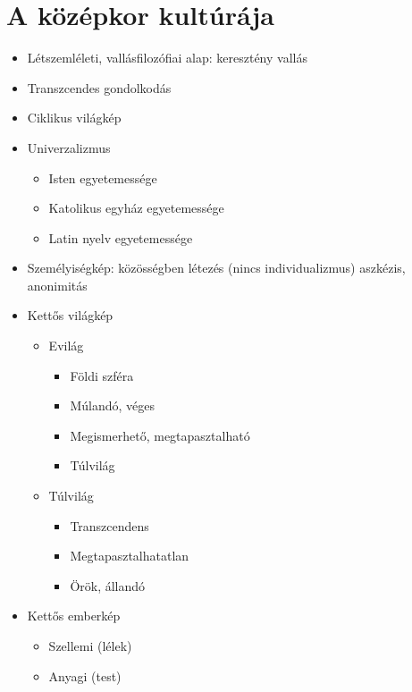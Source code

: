 \documentclass{article}
\begin{document}
\section{A középkor kultúrája}
\begin{itemize}
    \item Létszemléleti, vallásfilozófiai alap: keresztény vallás
    \item Transzcendes gondolkodás
    \item Ciklikus világkép
    
    \item Univerzalizmus 
    \begin{itemize}
        \item Isten egyetemessége
        \item Katolikus egyház egyetemessége
        \item Latin nyelv egyetemessége
    \end{itemize}

    \item Személyiségkép: közösségben létezés (nincs individualizmus) aszkézis, anonimitás

    \item Kettős világkép 
    \begin{itemize}
        \item Evilág 
        \begin{itemize}
            \item Földi szféra
            \item Múlandó,  véges
            \item Megismerhető, megtapasztalható
            \item Túlvilág
        \end{itemize}
        
        \item Túlvilág 
        \begin{itemize}
            \item Transzcendens
            \item Megtapasztalhatatlan
            \item Örök, állandó
        \end{itemize}
    \end{itemize}

    \item Kettős emberkép \begin{itemize}
        \item Szellemi (lélek)
        \item Anyagi (test)
    \end{itemize}

\end{itemize}
\end{document}
